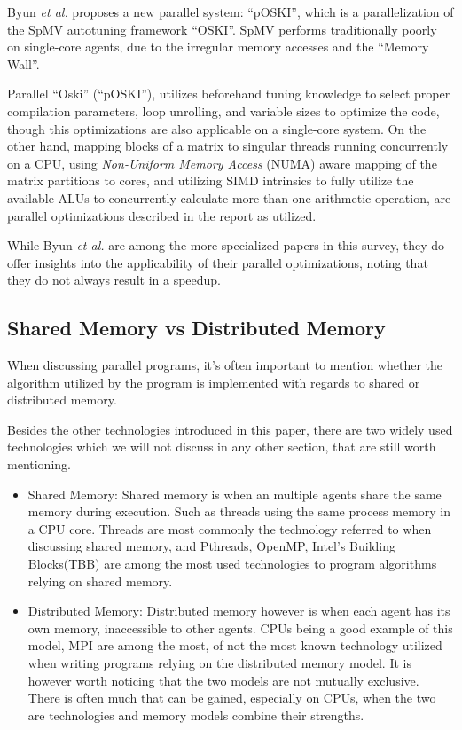 Byun \textit{et al.}\cite{Byun:EECS-2012-215} proposes a new parallel system: ``pOSKI'', which is a parallelization of the SpMV autotuning framework ``OSKI''.
SpMV performs traditionally poorly on single-core agents, due to the irregular memory accesses and the ``Memory Wall''.

Parallel ``Oski'' (``pOSKI''), utilizes beforehand tuning knowledge to select proper compilation parameters, loop unrolling, and variable sizes to optimize the code, though this optimizations are also applicable on a single-core system.
On the other hand, mapping blocks of a matrix to singular threads running concurrently on a CPU, using \textit{Non-Uniform Memory Access} (NUMA) aware mapping of the matrix partitions to cores, and utilizing SIMD intrinsics to fully utilize the available ALUs to concurrently calculate more than one arithmetic operation, are parallel optimizations described in the report as utilized.

While Byun \textit{et al.}\cite{Byun:EECS-2012-215} are among the more specialized papers in this survey, they do offer insights into the applicability of their parallel optimizations, noting that they do not always result in a speedup.

\subsection{Shared Memory vs Distributed Memory}

When discussing parallel programs, it's often important to mention whether the algorithm utilized by the program is implemented with regards to shared or distributed memory.

Besides the other technologies introduced in this paper, there are two widely used technologies which we will not discuss in any other section, that are still worth mentioning.

\begin{itemize}
	\item{Shared Memory:}
	Shared memory is when an multiple agents share the same memory during execution. Such as threads using the same process memory in a CPU core.
	Threads are most commonly the technology referred to when discussing shared memory, and Pthreads, OpenMP, Intel's Building Blocks\texttrademark (TBB) are among the most used technologies to program algorithms relying on shared memory.
	\item{Distributed Memory:}
		Distributed memory however is when each agent has its own memory, inaccessible to other agents.
		CPUs being a good example of this model, MPI are among the most, of not the most known technology utilized when writing programs relying on the distributed memory model.
		It is however worth noticing that the two models are not mutually exclusive.
		There is often much that can be gained, especially on CPUs, when the two are technologies and memory models combine their strengths.
\end{itemize}
